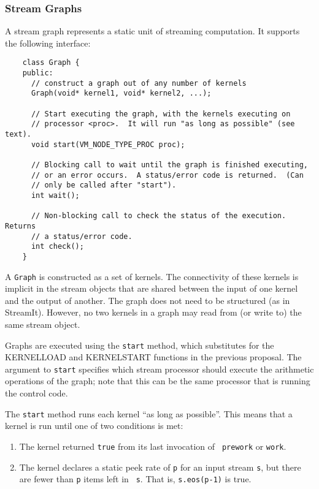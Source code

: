 \subsubsection{Stream Graphs}
\label{sec:streamgraph}

A stream graph represents a static unit of streaming computation.  It
supports the following interface:
{\small
\begin{verbatim}
    class Graph {
    public:
      // construct a graph out of any number of kernels
      Graph(void* kernel1, void* kernel2, ...);

      // Start executing the graph, with the kernels executing on
      // processor <proc>.  It will run "as long as possible" (see text).
      void start(VM_NODE_TYPE_PROC proc);

      // Blocking call to wait until the graph is finished executing,
      // or an error occurs.  A status/error code is returned.  (Can 
      // only be called after "start").
      int wait();

      // Non-blocking call to check the status of the execution.  Returns
      // a status/error code.
      int check();
    }
\end{verbatim}}

A {\tt Graph} is constructed as a set of kernels.  The connectivity of
these kernels is implicit in the stream objects that are shared
between the input of one kernel and the output of another.  The graph
does not need to be structured (as in StreamIt).  However, no two
kernels in a graph may read from (or write to) the same stream object.

Graphs are executed using the {\tt start} method, which substitutes
for the KERNELLOAD and KERNELSTART functions in the previous proposal.
The argument to {\tt start} specifies which stream processor should
execute the arithmetic operations of the graph; note that this can be
the same processor that is running the control code.

The {\tt start} method runs each kernel ``as long as possible''.  This
means that a kernel is run until one of two conditions is met: 
\begin{enumerate}

\item The kernel returned {\tt true} from its last invocation of {\tt
prework} or {\tt work}.

\item The kernel declares a static peek rate of {\tt p} for an input
stream {\tt s}, but there are fewer than {\tt p} items left in {\tt
s}.  That is, {\tt s.eos(p-1)} is true.

\end{enumerate}

